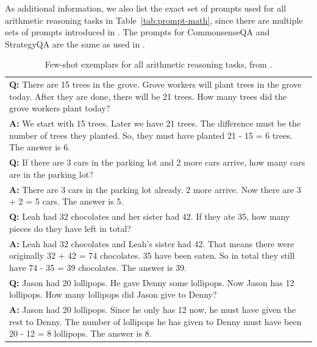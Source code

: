 As additional information, we also list the exact set of prompts used for all arithmetic reasoning tasks in Table~\ref{tab:prompt-math}, since there are multiple sets of prompts introduced in \cite{wei2022chain}. 
The prompts for CommonsenseQA and StrategyQA are the same as used in \cite{wei2022chain}.
\begin{table}
    \caption{
    Few-shot exemplars for all arithmetic reasoning tasks, from \cite{wei2022chain}.
    }
    \centering
    \small
    \begin{tabular}{p{13.5cm}}
        \toprule
        \textbf{Q:} There are 15 trees in the grove. Grove workers will plant trees in the grove today. After they are done, there will be 21 trees. How many trees did the grove workers plant today? \\
        \vspace{-1mm}
        \textbf{A:} We start with 15 trees. Later we have 21 trees. The difference must be the number of trees they planted. So, they must have planted 21 - 15 = 6 trees. The answer is 6. \\
        \vspace{0mm}
        \textbf{Q:} If there are 3 cars in the parking lot and 2 more cars arrive, how many cars are in the parking lot? \\
        \vspace{-1mm}
        \textbf{A:} There are 3 cars in the parking lot already. 2 more arrive. Now there are 3 + 2 = 5 cars. The answer is 5. \\
        \vspace{0mm}
        \textbf{Q:} Leah had 32 chocolates and her sister had 42. If they ate 35, how many pieces do they have left in total? \\
        \vspace{-1mm}
        \textbf{A:} Leah had 32 chocolates and Leah's sister had 42. That means there were originally 32 + 42 = 74 chocolates. 35 have been eaten. So in total they still have 74 - 35 = 39 chocolates. The answer is 39. \\
        \vspace{0mm}
        \textbf{Q:} Jason had 20 lollipops. He gave Denny some lollipops. Now Jason has 12 lollipops. How many lollipops did Jason give to Denny? \\
        \vspace{-1mm}
        \textbf{A:} Jason had 20 lollipops. Since he only has 12 now, he must have given the rest to Denny. The number of lollipops he has given to Denny must have been 20 - 12 = 8 lollipops. The answer is 8. \\

\end{tabular}
\end{table}
